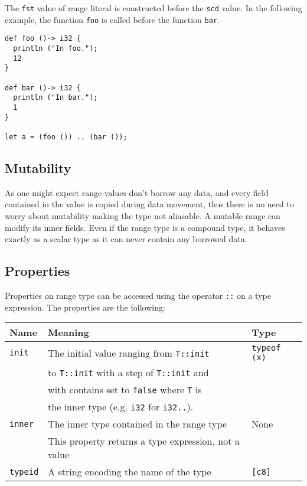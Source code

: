 The \texttt{fst} value of range literal is constructed before the \texttt{scd}
value. In the following example, the function \texttt{foo} is called before the
function \texttt{bar}.

\begin{lstlisting}[style=coloredverbatim]
def foo ()-> i32 {
  println ("In foo.");
  12
}

def bar ()-> i32 {
  println ("In bar.");
  1
}

let a = (foo ()) .. (bar ());
\end{lstlisting}

\subsection {Mutability}

As one might expect range values don't borrow any data, and every field
contained in the value is copied during data movement, thus there is no need to
worry about mutability making the type not aliasable. A mutable range can modify
its inner fields. Even if the range type is a compound type, it behaves exactly
as a scalar type as it can never contain any borrowed data.

\subsection {Properties}

Properties on range type can be accessed using the operator \texttt{::} on a
type expression. The properties are the following:

\begin{center}\begin{adjustbox}{max width=\linewidth}
  \begin{tabular}{|l|ll|}
    \hline
    Name & Meaning & Type\\
    \hline
    \hline
    \texttt{init} & The initial value ranging from \texttt{T::init} & \texttt{typeof (x)}\\
    & to \texttt{T::init} with a step of \texttt{T::init} and & \\
    & with contains set to \texttt{false} where \texttt{T} is & \\
    & the inner type (e.g. \texttt{i32} for \texttt{i32..}). &\\
    \Xhline{0.001pt}
    \texttt{inner} & The inner type contained in the range type & None \\
    & This property returns a type expression, not a value & \\
    \hline
    \texttt{typeid} & A string encoding the name of the type & \texttt{[c8]} \\
    \hline
  \end{tabular}
\end{adjustbox}\end{center}



